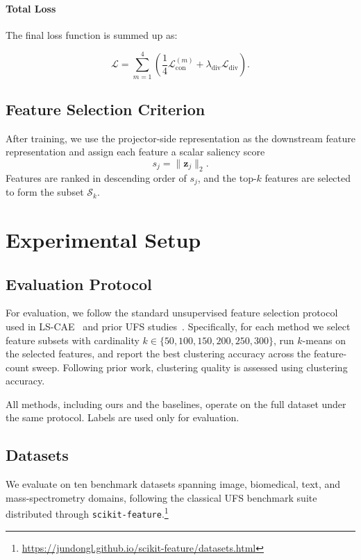 \documentclass[sigconf,natbib=true,anonymous=true]{acmart}
\begin{document}
\paragraph{Total Loss} The final loss function is summed up as:
    
\[
\mathcal{L}
=
\sum_{m=1}^{4}
\left(
\frac{1}{4}\mathcal{L}_{\mathrm{con}}^{(m)}
+
\lambda_{\mathrm{div}}\mathcal{L}_{\mathrm{div}}
\right).
\]
    


\subsection{Feature Selection Criterion}
After training, we use the projector-side representation as the downstream feature
representation and assign each feature a scalar saliency score
\[
s_j = \|\mathbf{z}_j\|_2.
\]
Features are ranked in descending order of $s_j$, and the top-$k$ features are
selected to form the subset $\mathcal{S}_k$.


\section{Experimental Setup}

\subsection{Evaluation Protocol}
For evaluation, we follow the standard unsupervised feature selection protocol used in LS-CAE~\cite{shaham2022deep} and prior UFS studies~\cite{li2012unsupervised}. Specifically, for each method we select feature subsets with cardinality
$k \in \{50,100,150,200,250,300\}$, run $k$-means on the selected features, and report the best clustering accuracy across the feature-count sweep. Following prior work, clustering quality is assessed using clustering accuracy.

All methods, including ours and the baselines, operate on the full dataset under
the same protocol. Labels are used only for evaluation.

\subsection{Datasets}
We evaluate on ten benchmark datasets spanning image, biomedical, text, and
mass-spectrometry domains, following the classical UFS benchmark suite
distributed through \texttt{scikit-feature}.\footnote{\url{https://jundongl.github.io/scikit-feature/datasets.html}}
\end{document}

